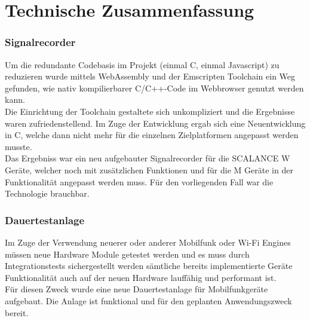 \chapter{Technische Zusammenfassung}
\subsection{Signalrecorder}
Um die redundante Codebasis im Projekt (einmal C, einmal Javascript) zu reduzieren wurde mittels WebAssembly und der Emscripten Toolchain ein Weg gefunden, wie nativ kompilierbarer C/C++-Code im Webbrowser genutzt werden kann. \\
Die Einrichtung der Toolchain gestaltete sich unkompliziert und die Ergebnisse waren zufriedenstellend. Im Zuge der Entwicklung ergab sich eine Neuentwicklung in C, welche dann nicht mehr für die einzelnen Zielplatformen angepasst werden musste. \\
Das Ergebniss war ein neu aufgebauter Signalrecorder für die SCALANCE W Geräte, welcher noch mit zusätzlichen Funktionen und für die M Geräte in der Funktionalität angepasst werden muss.
Für den vorliegenden Fall war die Technologie brauchbar. 
\subsection{Dauertestanlage}
Im Zuge der Verwendung  neuerer oder anderer Mobilfunk oder Wi-Fi Engines müssen  neue Hardware Module getestet werden und es muss durch Integrationstests sichergestellt werden sämtliche bereits implementierte Geräte Funktionalität auch auf der neuen Hardware lauffähig und performant ist. \\
Für diesen Zweck wurde eine neue Dauertestanlage für Mobilfunkgeräte aufgebaut. Die Anlage ist funktional und für den geplanten Anwendungszweck bereit.
